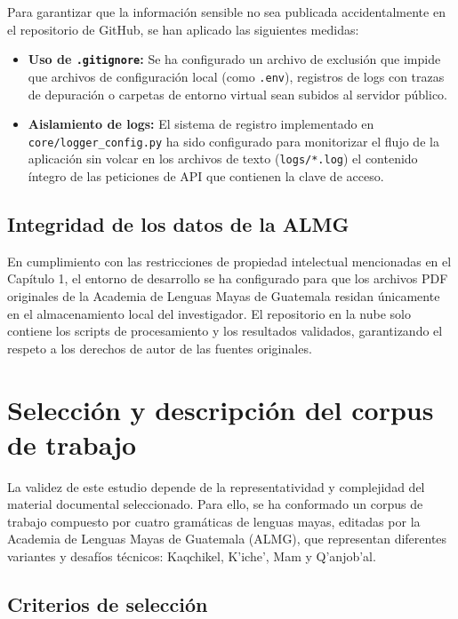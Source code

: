Para garantizar que la información sensible no sea publicada accidentalmente en el repositorio de GitHub, se han aplicado las siguientes medidas:

\begin{itemize}
    \item \textbf{Uso de \texttt{.gitignore}:} Se ha configurado un archivo de exclusión que impide que archivos de configuración local (como \texttt{.env}), registros de logs con trazas de depuración o carpetas de entorno virtual sean subidos al servidor público.
    
    \item \textbf{Aislamiento de logs:} El sistema de registro implementado en \texttt{core/logger\_config.py} ha sido configurado para monitorizar el flujo de la aplicación sin volcar en los archivos de texto (\texttt{logs/*.log}) el contenido íntegro de las peticiones de API que contienen la clave de acceso.
\end{itemize}

\subsection{Integridad de los datos de la ALMG}

En cumplimiento con las restricciones de propiedad intelectual mencionadas en el Capítulo 1, el entorno de desarrollo se ha configurado para que los archivos PDF originales de la Academia de Lenguas Mayas de Guatemala residan únicamente en el almacenamiento local del investigador. El repositorio en la nube solo contiene los scripts de procesamiento y los resultados validados, garantizando el respeto a los derechos de autor de las fuentes originales.

\section{Selección y descripción del corpus de trabajo}

La validez de este estudio depende de la representatividad y complejidad del material documental seleccionado. Para ello, se ha conformado un corpus de trabajo compuesto por cuatro gramáticas de lenguas mayas, editadas por la Academia de Lenguas Mayas de Guatemala (ALMG), que representan diferentes variantes y desafíos técnicos: Kaqchikel, K’iche’, Mam y Q’anjob’al.

\subsection{Criterios de selección}

